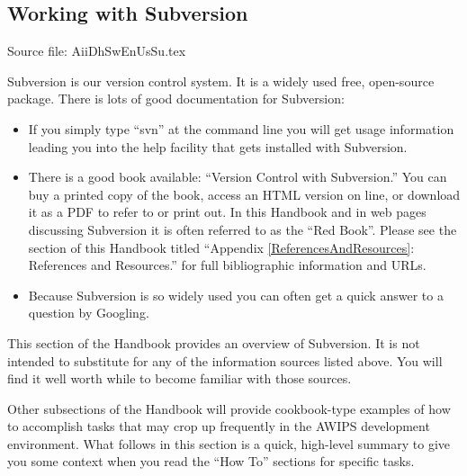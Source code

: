 
\subsection{Working with Subversion}

Source file: AiiDhSwEnUsSu.tex

Subversion is our version control system.  It is a widely
used free, open-source package.  There is lots of good
documentation for Subversion:
\begin{itemize}
\item
If you simply type ``svn'' at the command line you will get
usage information leading you into the help facility that
gets installed with Subversion.
\item
There is a good book available: ``Version Control with
Subversion.''  You can buy a printed copy of the book,
access an HTML version on line, or download it as a PDF to
refer to or print out.  In this Handbook and in web pages
discussing Subversion it is often referred to as the ``Red Book''.
Please see the section of this Handbook 
titled ``Appendix \ref{ReferencesAndResources}: References and Resources.''
for full bibliographic information and URLs.
\item
Because Subversion is so widely used you can often get a
quick answer to a question by Googling.
\end{itemize}

This section of the Handbook provides an overview of
Subversion.  It is not intended to substitute for any of
the information sources listed above.  You will find it
well worth while to
become familiar with those sources.  

Other subsections of
the Handbook will provide cookbook-type examples of how to
accomplish tasks that may crop up frequently in the AWIPS
development environment.  What follows in this section is
a quick, high-level summary to give you some context when
you read the ``How To'' sections for specific tasks.

